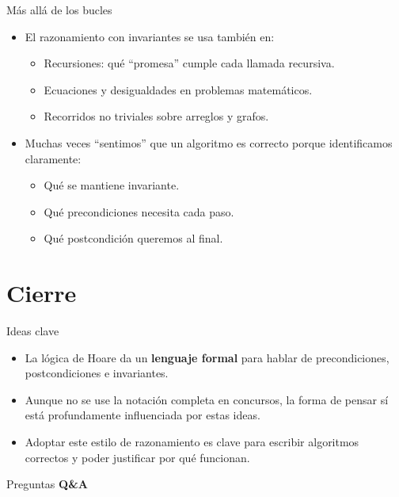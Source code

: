 \documentclass[aspectratio=169]{beamer}
\begin{document}
\begin{frame}{Más allá de los bucles}
  \begin{itemize}
    \item El razonamiento con invariantes se usa también en:
      \begin{itemize}
        \item Recursiones: qué “promesa” cumple cada llamada recursiva.
        \item Ecuaciones y desigualdades en problemas matemáticos.
        \item Recorridos no triviales sobre arreglos y grafos.
      \end{itemize}
    \item Muchas veces “sentimos” que un algoritmo es correcto porque identificamos claramente:
      \begin{itemize}
        \item Qué se mantiene invariante.
        \item Qué precondiciones necesita cada paso.
        \item Qué postcondición queremos al final.
      \end{itemize}
  \end{itemize}
\end{frame}

\section*{Cierre}

\begin{frame}{Ideas clave}
  \begin{itemize}
    \item La lógica de Hoare da un \textbf{lenguaje formal} para hablar de precondiciones, postcondiciones e invariantes.
    \item Aunque no se use la notación completa en concursos, la forma de pensar sí está profundamente influenciada por estas ideas.
    \item Adoptar este estilo de razonamiento es clave para escribir algoritmos correctos y poder justificar por qué funcionan.
  \end{itemize}
\end{frame}

\begin{frame}{Preguntas}
  \centering
  \Huge
  \textbf{Q\&A}
\end{frame}
\end{document}

